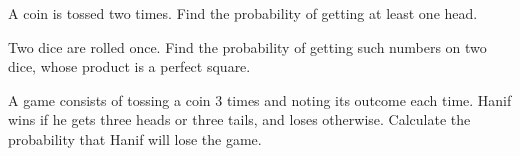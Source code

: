 
    \item A coin is tossed two times. Find the probability of getting at least one head.
    \item Two dice are rolled once. Find the probability of getting such numbers on two dice, whose product is a perfect square.
    \item A game consists of tossing a coin 3 times and noting its outcome each time. Hanif wins if he gets three heads or three tails, and loses otherwise. Calculate the probability that Hanif will lose the game.

